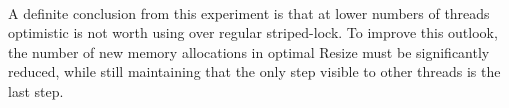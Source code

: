 \documentclass{article}
\begin{document}
\begin{adjustwidth}{-2cm}{-2cm}
\null\\
A definite conclusion from this experiment is that at lower numbers of threads optimistic is not worth using over regular striped-lock. To improve this outlook, the number of new memory allocations in optimal Resize must be significantly reduced, while still maintaining that the only step visible to other threads is the last step.
\end{adjustwidth}
\end{document}
